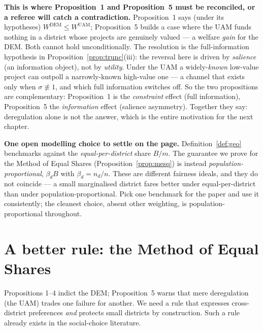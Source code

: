 \documentclass[11pt,letterpaper]{article}
\theoremstyle{definition}
\theoremstyle{plain}
\theoremstyle{remark}
\newcommand{\budget}{B}
\newcommand{\DEM}{\text{DEM}}
\newcommand{\UAM}{\text{UAM}}
\begin{document}
\begin{watchout}
\textbf{This is where Proposition~1 and Proposition~5 must be reconciled, or a referee will catch a
contradiction.} Proposition~1 says (under its hypotheses) $W^{\DEM}\le W^{\UAM}$; Proposition~5
builds a case where the UAM funds nothing in a district whose projects are genuinely valued ---
a welfare \emph{gain} for the DEM. Both cannot hold unconditionally. The resolution is the
full-information hypothesis in Proposition~\ref{prop:trunc}(iii): the reversal here is driven by
\emph{salience} (an information object), not by \emph{utility}. Under the UAM a widely-\emph{known}
low-value project can outpoll a narrowly-known high-value one --- a channel that exists only when
$\sigma\not\equiv1$, and which full information switches off. So the two propositions are
complementary: Proposition~1 is the \emph{constraint} effect (full information), Proposition~5 the
\emph{information} effect (salience asymmetry). Together they say: deregulation alone is not the
answer, which is the entire motivation for the next chapter.
\end{watchout}

\begin{aside}\small
\textbf{One open modelling choice to settle on the page.} Definition~\ref{def:geo} benchmarks
against the \emph{equal-per-district} share $\budget/m$. The guarantee we prove for the Method of
Equal Shares (Proposition~\ref{prop:mesq}) is instead \emph{population-proportional},
$\beta_d\budget$ with $\beta_d=n_d/n$. These are different fairness ideals, and they do not coincide
--- a small marginalised district fares better under equal-per-district than under
population-proportional. Pick one benchmark for the paper and use it consistently; the cleanest
choice, absent other weighting, is population-proportional throughout.
\end{aside}

\section{A better rule: the Method of Equal Shares}
\label{sec:mes}

Propositions 1--4 indict the DEM; Proposition~5 warns that mere deregulation (the UAM) trades one
failure for another. We need a rule that expresses cross-district preferences \emph{and} protects
small districts by construction. Such a rule already exists in the social-choice literature.
\end{document}
